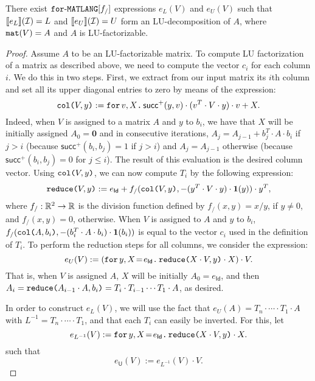 \begin{proposition}\label{prop:gauss}
There exist $\langforf{f_/}$ expressions $e_L(V)$ and $e_U(V)$ such that
$\sem{e_L}{\I}=L$ and $\sem{e_U}{\I}=U$ form an LU-decomposition of $A$,
where $\conc(V)=A$ and $A$ is LU-factorizable.
\end{proposition}
\begin{proof}
Assume $A$ to be an LU-factorizable matrix. To compute LU factorization of a matrix as described above, we need to compute the vector $c_i$ for each column $i$. We do this in two steps. First, we extract from our input matrix its $i$th column and set all its upper diagonal entries to zero
by means of 
 the 
 expression:
$$\ccol{V}{y} := \ffor{v}{X}{\mathsf{succ}^+(y,v)\cdot(v^T\cdot V \cdot y)\cdot v + X}.$$
Indeed, when $V$ is assigned to a matrix $A$ and $y$ to $b_i$, we have that $X$ will be initially assigned
$A_0=\mathbf{0}$ and in consecutive iterations,  $A_j=A_{j-1}+ b_j^T\cdot A\cdot b_i$ if $j>i$ (because $\mathsf{succ}^+(b_i,b_j)=1$ if $j>i$) and $A_j=A_{j-1}$ otherwise (because $\mathsf{succ}^+(b_i,b_j)=0$ for $j\leq i$). The result of this evaluation is the desired column vector.
Using $\ccol{V}{y}$, we can now compute $T_i$ by the following expression:
$$\red{V}{y} := e_{\mathsf{Id}}+ f_/(\ccol{V}{y},-(y^T\cdot V\cdot y)\cdot \ones(y))\cdot y^T,$$
where $f_/:\RR^2\to\RR$ is the division function defined by
$f_/(x,y)=x/y$, if $y\neq 0$, and $f_/(x,y)=0$, otherwise. 
When $V$ is assigned to $A$ and $y$ to $b_i$, $f_/(\ccol{A}{b_i},-(b_i^T\cdot A\cdot b_i)\cdot \ones(b_i))$ is equal to the vector $c_i$ used in the definition of $T_i$. To perform the reduction steps for all columns, we consider
the expression:
$$
e_{U}(V) :=  \left( \initf{e_{\mathsf{Id}}}{y}{X}{\red{X\cdot V}{y}\cdot X} \right) \cdot V.
$$
That is, when $V$ is assigned $A$, $X$ will be initially $A_0=e_{\mathsf{Id}}$, and then
$A_i=\red{A_{i-1}\cdot A}{b_i}=T_i\cdot T_{i-1}\cdots T_1\cdot A$, as desired.

In order to construct $e_L(V)$, we will use the fact that $e_U(A)=T_n\cdot\cdots\cdot T_1\cdot A$ with $L^{-1}=T_n\cdot\cdots\cdot T_1$, and that each $T_i$ can easily be inverted. For this, let
    $$
    e_{L^{-1}}(V) :=  \initf{e_{\mathsf{Id}}}{y}{X}{\red{X\cdot V}{y}\cdot X}.
    $$
    such that	$$
        e_{\mathsf{U}}(V) :=  e_{L^{-1}}(V) \cdot V.
        $$


\end{proof}
